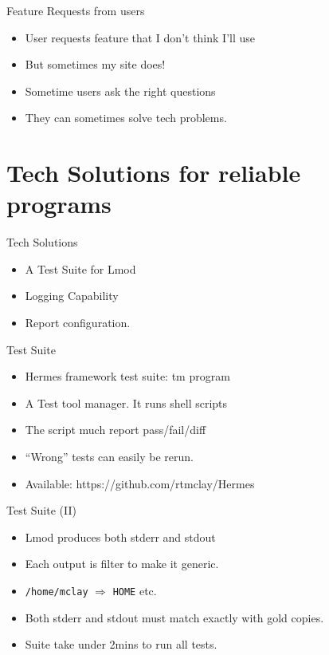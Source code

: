 \documentclass{beamer}
\begin{document}
\begin{frame}{Feature Requests from users}
  \begin{itemize}
    \item User requests feature that I don't think I'll use
    \item But sometimes my site does!
    \item Sometime users ask the right questions 
    \item They can sometimes solve tech problems.
  \end{itemize}
\end{frame}



\section{Tech Solutions for reliable programs}

\begin{frame}{Tech Solutions}
  \begin{itemize}
    \item A Test Suite for Lmod
    \item Logging Capability
    \item Report configuration.
  \end{itemize}
\end{frame}

\begin{frame}{Test Suite }
  \begin{itemize}
    \item Hermes framework test suite: tm program
    \item A Test tool manager.  It runs shell scripts
    \item The script much report pass/fail/diff
    \item ``Wrong'' tests can easily be rerun.
    \item Available: https://github.com/rtmclay/Hermes
  \end{itemize}
\end{frame}

\begin{frame}{Test Suite (II) }
  \begin{itemize}
    \item Lmod produces both stderr and stdout
    \item Each output is filter to make it generic. 
    \item \texttt{/home/mclay} $\Rightarrow$ \texttt{HOME} etc.
    \item Both stderr and stdout must match exactly with gold copies.
    \item Suite take under 2mins to run all tests.
  \end{itemize}
\end{frame}
\end{document}
